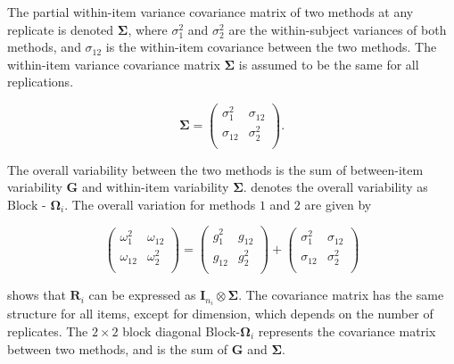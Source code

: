 \documentclass[12pt, a4paper]{article}
\theoremstyle{plain}
\theoremstyle{definition}
\theoremstyle{remark}
\begin{document}
	
	The partial within-item variance covariance matrix of two methods at any replicate is denoted $\boldsymbol{\Sigma}$, where $\sigma^2_{1}$ and $\sigma^2_{2}$ are the within-subject variances of both methods, and $\sigma_{12}$ is the within-item covariance between the two methods. The within-item variance covariance matrix $\boldsymbol{\Sigma}$ is assumed to be the same for all replications.
	
	\[
	\boldsymbol{\Sigma} = \left( \begin{array}{cc}
	\sigma^2_{1} & \sigma_{12} \\
	\sigma_{12} & \sigma^2_{2} \\
	\end{array}\right).
	\]
	
	
	
The overall variability between the two methods is the sum of between-item variability
	$\boldsymbol{G}$ and within-item variability $\boldsymbol{\Sigma}$. \citet{ARoy2009} denotes the overall variability	as ${\mbox{Block - }\boldsymbol \Omega_{i}}$. The overall variation for methods $1$ and $2$ are given by
	
	\begin{center}
		\[\left(\begin{array}{cc}
		\omega^2_1  & \omega_{12} \\
		\omega_{12} & \omega^2_2 \\
		\end{array}  \right)
		=  \left(
		\begin{array}{cc}
		g^2_1  & g_{12} \\
		g_{12} & g^2_2 \\
		\end{array} \right)+
		\left(
		\begin{array}{cc}
		\sigma^2_1  & \sigma_{12} \\
		\sigma_{12} & \sigma^2_2 \\
		\end{array}\right)
		\]
	\end{center}
	\citet{hamlett} shows that $\boldsymbol{R}_{i}$  can be expressed as $\boldsymbol{I}_{n_{i}} \otimes \boldsymbol{\Sigma}$. The covariance matrix has the same structure for all items, except for dimension, which depends on the number of replicates. The $2 \times 2$ block diagonal Block-$\boldsymbol{\Omega}_{i}$ represents the covariance matrix between two methods, and is the sum of $\boldsymbol{G}$ and $\boldsymbol{\Sigma}$.
	
\end{document}
